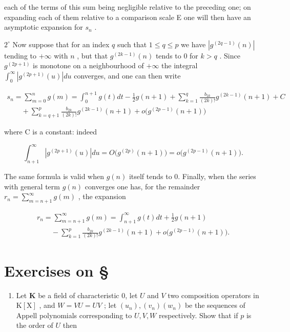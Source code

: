 each of the terms of this sum being negligible relative to the preceding one; on expanding each of them relative to a comparison scale E one will then have an asymptotic expansion for \(s_{n}\) .

\(2^{\circ}\) Now suppose that for an index \(q\) such that \(1 \leqslant q \leqslant p\) we have \(\left|g^{(2q-1)}(n)\right|\) tending to \(+\infty\) with \(n\) , but that \(g^{(2k-1)}(n)\) tends to 0 for \(k > q\) . Since \(g^{(2p+1)}\) is monotone on a neighbourhood of \(+\infty\) the integral \(\int_0^\infty \left|g^{(2p+1)}(u)\right| du\) converges, and one can then write

\[
\begin{array}{l} s _ {n} = \sum_ {m = 0} ^ {n} g (m) = \int_ {0} ^ {n + 1} g (t) d t - \frac {1}{2} g (n + 1) + \sum_ {k = 1} ^ {q} \frac {b _ {2 k}}{(2 k) !} g ^ {(2 k - 1)} (n + 1) + C \\ \qquad + \sum_ {k = q + 1} ^ {p} \frac {b _ {2 k}}{(2 k) !} g ^ {(2 k - 1)} (n + 1) + o \big (g ^ {(2 p - 1)} (n + 1) \big) \end{array}
\]

where C is a constant: indeed

\[
\int_ {n + 1} ^ {\infty} \left| g ^ {(2 p + 1)} (u) \right| d u = O \big (g ^ {(2 p)} (n + 1) \big) = o \big (g ^ {(2 p - 1)} (n + 1) \big).
\]

The same formula is valid when \(g(n)\) itself tends to 0. Finally, when the series with general term \(g(n)\) converges one has, for the remainder \(r_n = \sum_{m=n+1}^{\infty} g(m)\) , the expansion

\[
\begin{array}{l} r _ {n} = \sum_ {m = n + 1} ^ {\infty} g (m) = \int_ {n + 1} ^ {\infty} g (t) d t + \frac {1}{2} g (n + 1) \\ \qquad - \sum_ {k = 1} ^ {p} \frac {b _ {2 k}}{(2 k) !} g ^ {(2 k - 1)} (n + 1) + o \big (g ^ {(2 p - 1)} (n + 1) \big). \end{array}
\]

\setcounter{exercisegroup}{0}
\section*{Exercises on \S{}}
{}

\begin{enumerate}
\def\labelenumi{\arabic{enumi})}
\tightlist
\item
  Let \(\mathbf{K}\) be a field of characteristic 0, let \(U\) and \(V\) two composition operators in \(\mathrm{K}[\mathrm{X}]\) , and \(W = VU = UV\) ; let \((u_n), (v_n)(w_n)\) be the sequences of Appell polynomials corresponding to \(U, V, W\) respectively. Show that if \(p\) is the order of \(U\) then
\end{enumerate}

